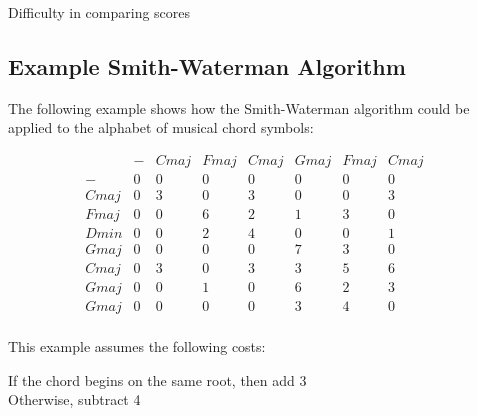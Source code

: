 \item Difficulty in comparing scores

\subsection{Example Smith-Waterman Algorithm}

The following example shows how the Smith-Waterman algorithm could be applied to the alphabet of musical chord symbols:

\[ \begin{array}{cccccccc} & - & Cmaj & Fmaj & Cmaj & Gmaj & Fmaj & Cmaj & \\ - & 0 & 0 & 0 & 0 & 0 & 0 & 0 & \\ Cmaj & 0 & 3 & 0 & 3 & 0 & 0 & 3 & \\ Fmaj & 0 & 0 & 6 & 2 & 1 & 3 & 0 & \\ Dmin & 0 & 0 & 2 & 4 & 0 & 0 & 1 & \\ Gmaj & 0 & 0 & 0 & 0 & 7 & 3 & 0 & \\ Cmaj & 0 & 3 & 0 & 3 & 3 & 5 & 6 & \\ Gmaj & 0 & 0 & 1 & 0 & 6 & 2 & 3 & \\ Gmaj & 0 & 0 & 0 & 0 & 3 & 4 & 0 & \\ \end{array} \]

This example assumes the following costs:

If the chord begins on the same root, then add 3 \\
Otherwise, subtract 4 \\